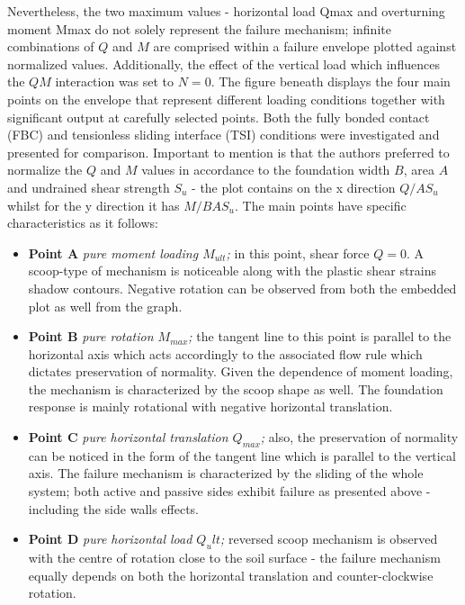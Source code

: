 \documentclass[12pt,a4paper]{report}
\begin{document}
Nevertheless, the two maximum values - horizontal load Qmax and overturning moment Mmax do not solely represent the failure mechanism; infinite combinations of $Q$ and $M$ are comprised within a failure envelope plotted against normalized values. Additionally, the effect of the vertical load which influences the $QM$ interaction was set to $N=0$. The figure beneath displays the four main points on the envelope that represent different loading conditions together with significant output at carefully selected points. Both the fully bonded contact (FBC) and tensionless sliding interface (TSI) conditions were investigated and presented for comparison. Important to mention is that the authors preferred to normalize the $Q$ and $M$ values in accordance to the foundation width $B$, area $A$ and undrained shear strength $S_u$ - the plot contains on the x direction $Q/AS_u$ whilst for the y direction it has $M/BAS_u$. 
The main points have specific characteristics as it follows:
\begin{itemize}
		\item \textbf{Point A} \textit{pure moment loading $M_{ult}$;} in this point, shear force $Q=0$. A scoop-type of mechanism is noticeable along with the plastic shear strains shadow contours. Negative rotation can be observed from both the embedded plot as well from the graph.
	\item\textbf{Point B} \textit{pure rotation $M_{max}$;} the tangent line to this point is parallel to the horizontal axis which acts accordingly to the associated flow rule which dictates preservation of normality. Given the dependence of moment loading, the mechanism is characterized by the scoop shape as well. The foundation response is mainly rotational with negative horizontal translation.  
	\item\textbf{Point C} \textit{pure horizontal translation $Q_{max}$;} also, the preservation of normality can be noticed in the form of the tangent line which is parallel to the vertical axis. The failure mechanism is characterized by the sliding of the whole system; both active and passive sides exhibit failure as presented above - including the side walls effects.
	\item\textbf{Point D} \textit{pure horizontal load $Q_ult$;} reversed scoop mechanism is observed with the centre of rotation close to the soil surface - the failure mechanism equally depends on both the horizontal translation and counter-clockwise rotation.
\end{itemize}
\end{document}
